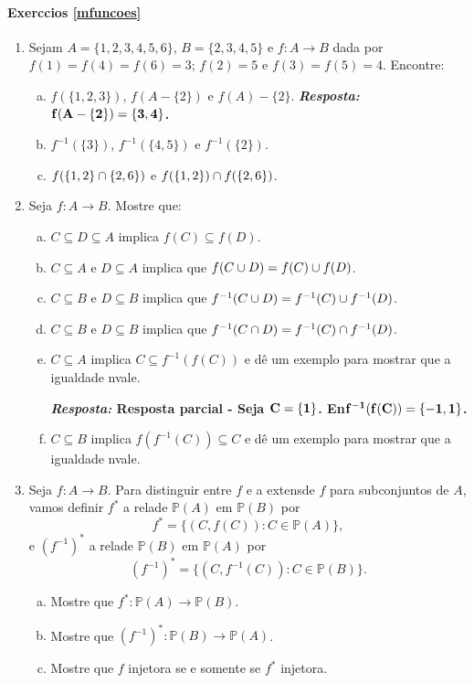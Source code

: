 \paragraph{Exerc\ih cios \ref{mfuncoes}}

\begin{enumerate}[{\bf 1.}]

\item Sejam $A=\{1,2,3,4,5,6\}$, $B=\{2,3,4,5\}$ e $f:A\to B$ dada por $f(1)=f(4)=f(6)=3$; $f(2)=5$ e $f(3)=f(5)=4$. Encontre:
\begin{enumerate}[a)]
\item $f(\{1,2,3\})$, $f(A-\{2\})$ e $f(A)-\{2\}$. {\bf{\it Resposta:} ${\bf f(A-\{2\})=\{3,4\}}$.}
\item $f^{-1}(\{3\})$, $f^{-1}(\{4,5\})$ e $f^{-1}(\{2\})$.
\item $f(\{1,2\}\cap \{2,6\})$ e $f(\{1,2\})\cap f(\{2,6\})$. 
\end{enumerate}

\item Seja $f:A\to B$. Mostre que:
\begin{enumerate}[a)]
\item $C\subseteq D\subseteq A$ implica $f(C)\subseteq f(D)$.
\item $C\subseteq A$ e $D \subseteq A$ implica que $f(C\cup D)=f(C)\cup f(D)$. 
\item $C\subseteq B$ e $D \subseteq B$ implica que $f^{-1}(C\cup D)=f^{-1}(C)\cup f^{-1}(D)$.
\item $C\subseteq B$ e $D \subseteq B$ implica que $f^{-1}(C\cap D)=f^{-1}(C)\cap f^{-1}(D)$.
\item $C\subseteq A$ implica $C\subseteq f^{-1}(f(C))$ e d\^e um exemplo para mostrar que a igualdade n\ao vale. 

{\bf{\it Resposta:} Resposta parcial - Seja ${\bf C=\{1\}}$. En\tao ${\bf f^{-1}(f(C))=\{-1,1\}}$.}

\item $C\subseteq B$ implica $f(f^{-1}(C))\subseteq C$ e d\^e um exemplo para mostrar que a igualdade n\ao vale. 
\end{enumerate}

\item Seja $f:A\to B$. Para distinguir entre $f$ e a extens\ao de $f$ para subconjuntos de $A$, vamos definir $f^{\ast}$ a rela\cao de $\mathbb{P}(A)$ em $\mathbb{P}(B)$ por
\[
f^{\ast}=\{(C,f(C)): C\in \mathbb{P}(A)\},
\]
e $(f^{-1})^{\ast}$ a rela\cao de $\mathbb{P}(B)$ em $\mathbb{P}(A)$ por
\[
(f^{-1})^{\ast}=\{(C,f^{-1}(C)): C\in \mathbb{P}(B)\}.
\]
\begin{enumerate}[a)]
\item Mostre que $f^{\ast}:\mathbb{P}(A)\to\mathbb{P}(B)$.
\item Mostre que $(f^{-1})^{\ast}:\mathbb{P}(B)\to\mathbb{P}(A)$.
\item Mostre que $f$ injetora se e somente se $f^{\ast}$ injetora.


\end{enumerate}
\end{enumerate}
